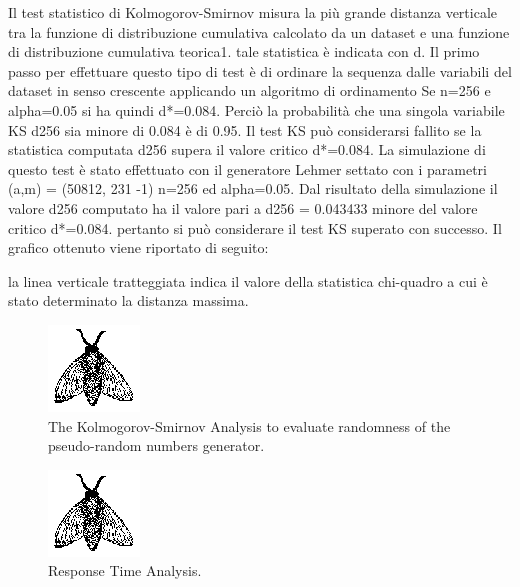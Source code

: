 Il test statistico di Kolmogorov-Smirnov misura la più grande distanza verticale tra la funzione di distribuzione cumulativa calcolato da un dataset e una funzione di distribuzione cumulativa teorica1. tale statistica è indicata con d.
Il primo passo per effettuare questo tipo di test è di ordinare la sequenza dalle variabili  del dataset in senso crescente applicando un algoritmo di ordinamento
Se n=256 e alpha=0.05 si ha quindi d*=0.084. Perciò la probabilità che una singola variabile KS d256 sia minore di 0.084 è di 0.95. Il test KS può considerarsi fallito se la statistica computata  d256 supera il valore critico d*=0.084.
La simulazione di questo test è stato effettuato con il generatore Lehmer settato con i parametri (a,m) = (50812, 231 -1)  n=256 ed alpha=0.05.
Dal risultato della simulazione il valore  d256 computato ha il valore pari a d256 = 0.043433 minore del valore critico d*=0.084. pertanto si può considerare il test KS superato con successo.
Il grafico ottenuto viene riportato di seguito:

la linea verticale tratteggiata indica il valore della statistica chi-quadro a cui è stato determinato la distanza massima.

\begin{figure}
  \label{fig:experimental-analysis-randomness-kolmogorov-smirnov}
  \includegraphics{fig/fly}
  \caption{The Kolmogorov-Smirnov Analysis to evaluate randomness of the pseudo-random numbers generator.}
\end{figure}


\lipsum[1]

\begin{figure}
  \label{fig:experimental-analysis-response-time}
  \includegraphics{fig/fly}
  \caption{Response Time Analysis.}
\end{figure}
